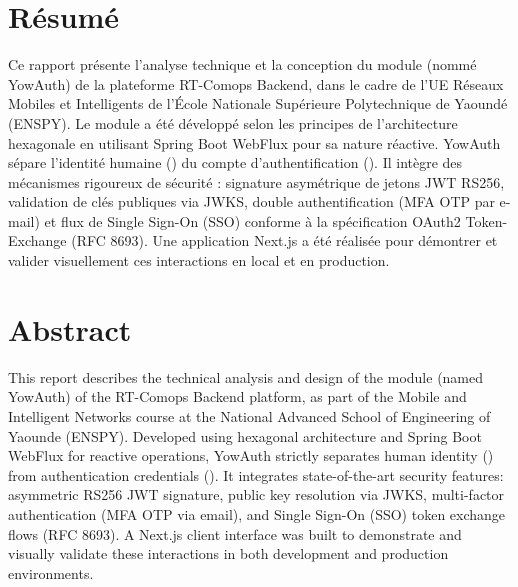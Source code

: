 \chapter*{Résumé}

Ce rapport présente l'analyse technique et la conception du module \textbf{} (nommé YowAuth) de la plateforme RT-Comops Backend, dans le cadre de l'UE Réseaux Mobiles et Intelligents de l'École Nationale Supérieure Polytechnique de Yaoundé (ENSPY). Le module a été développé selon les principes de l'architecture hexagonale en utilisant Spring Boot WebFlux pour sa nature réactive. YowAuth sépare l'identité humaine () du compte d'authentification (). Il intègre des mécanismes rigoureux de sécurité : signature asymétrique de jetons JWT RS256, validation de clés publiques via JWKS, double authentification (MFA OTP par e-mail) et flux de Single Sign-On (SSO) conforme à la spécification OAuth2 Token-Exchange (RFC 8693). Une application Next.js a été réalisée pour démontrer et valider visuellement ces interactions en local et en production.

\vspace{1.5cm}

\chapter*{Abstract}

This report describes the technical analysis and design of the \textbf{} module (named YowAuth) of the RT-Comops Backend platform, as part of the Mobile and Intelligent Networks course at the National Advanced School of Engineering of Yaounde (ENSPY). Developed using hexagonal architecture and Spring Boot WebFlux for reactive operations, YowAuth strictly separates human identity () from authentication credentials (). It integrates state-of-the-art security features: asymmetric RS256 JWT signature, public key resolution via JWKS, multi-factor authentication (MFA OTP via email), and Single Sign-On (SSO) token exchange flows (RFC 8693). A Next.js client interface was built to demonstrate and visually validate these interactions in both development and production environments.
